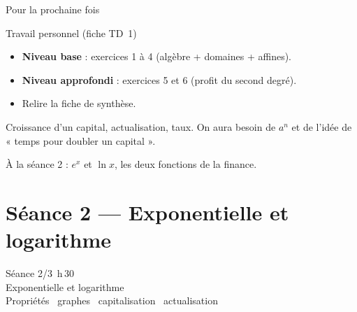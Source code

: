 \documentclass[10pt,aspectratio=169]{beamer}
\numberwithin{dummy}{section}
\begin{document}
\begin{frame}{Pour la prochaine fois}
\begin{block}{Travail personnel (fiche TD~1)}
\begin{itemize}
    \item \textbf{Niveau base} : exercices 1 à 4 (algèbre + domaines + affines).
    \item \textbf{Niveau approfondi} : exercices 5 et 6 (profit du second degré).
    \item Relire la fiche de synthèse.
\end{itemize}
\end{block}

\vspace{0.5em}
\begin{boxgestion}
Croissance d'un capital, actualisation, taux.
On aura besoin de $a^n$ et de l'idée de « temps pour doubler un capital ».
\end{boxgestion}

\vspace{0.4em}
\centering
{\large À la séance 2 : $e^x$ et $\ln x$, les deux fonctions de la finance.}
\end{frame}


\part{Séance 2 --- Exponentielle et logarithme}

\begin{frame}[plain]
\centering
\vspace{1.6cm}
{\Large Séance 2/3 \quad\textemdash{}\,h\,30}\\[0.8em]
{ Exponentielle et logarithme}\\[1.2em]
{\large Propriétés \textbullet\ graphes \textbullet\ capitalisation \textbullet\ actualisation}
\end{frame}
\end{document}
